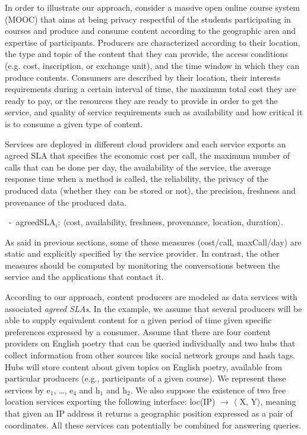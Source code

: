 In order to illustrate our approach, consider a massive open online course system (MOOC) that aims at being privacy respectful of the students participating in courses and produce and consume content according to the geographic area and expertise of participants. 
Producers are characterized according to their location, the type and topic of the content that they can provide, the access conditions (e.g. cost, inscription, or exchange unit), and the time window in which they can produce contents. 
Consumers are described by their location, their interests requirements during a certain interval of time, the maximum total cost they are ready to pay, or the resources they are ready to provide in order to get the service, and quality of service requirements such as availability and how critical it is to consume a given type of content. 

Services are deployed in different cloud providers and each service exports an agreed SLA that specifies the economic cost per call, the maximum number of calls that can be done per day, the availability of the service, the average response time when a method is called, the reliability, the privacy of the produced data (whether they can be stored or not), the precision, freshness and provenance of the produced data. 


\begin{trivlist}\sf\footnotesize
\item[~-~agreedSLA$_i$:] $\langle$cost, availability, freshness, provenance, location, duration$\rangle$. 
 \end{trivlist}
 
As said in previous sections, some of these measures ({\sf cost/call, maxCall/day}) are static and explicitly specified by the service provider. 
In contrast, the other measures should be computed by monitoring the conversations between the service and the applications that contact it.  


According to our approach, content producers are modeled as data services with associated \textit{agreed SLAs}. 
In the example, we assume that several producers will be able to supply equivalent content for a given period of time given specific  preferences expressed by a consumer. 
Assume that there are four content providers on English poetry that can be queried individually and two hubs that collect information from other sources like social network groups and hash tags.
Hubs will store content about given topics on  English poetry, available from particular producers (e.g., participants of a given course).
We represent these services by {\sf e$_1$, \dots, e$_4$} and {\sf h$_1$} and {\sf h$_2$}.
We also suppose the existence of two free location services exporting the following interface: {\sf loc(IP) $\rightarrow$ $\langle$ X, Y$\rangle$}, meaning that given an IP address it returns a geographic position expressed as a pair of coordinates. 
All these services can potentially be combined for answering queries.

